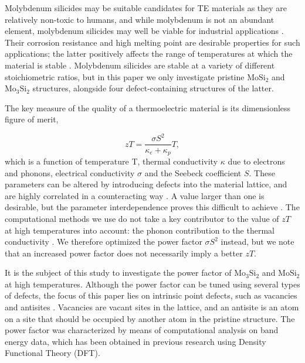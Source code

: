\documentclass[7.5pt]{article}
\theoremstyle{plain}
\theoremstyle{definition}
\newcommand{\<}{\langle}
\renewcommand{\>}{\rangle}
\begin{document}
\begin{multicols}{2}
Molybdenum silicides may be suitable candidates for TE materials as they are relatively non-toxic to humans, and while molybdenum is not an abundant element, molybdenum silicides may well be viable for industrial applications \cite{NOVOTNY2018272, HENCKENS201861, STOLOFF20001313}.
Their corrosion resistance and high melting point are desirable properties for such applications; the latter positively affects the range of temperatures at which the material is stable \cite{Nozariasbmarz_2017}.
Molybdenum silicides are stable at a variety of different stoichiometric ratios, but in this paper we only investigate pristine $\text{MoSi}_2$ and $\text{Mo}_3\text{Si}_2$ structures, alongside four defect-containing structures of the latter.
 
The key measure of the quality of a thermoelectric material is its dimensionless figure of merit,

\begin{equation}
z T=\frac{\sigma S^2}{\kappa_{e} + \kappa_{p}}T,
\label{eq:zt}
\end{equation}
 which is a function of temperature T, thermal conductivity $\kappa$ due to electrons and phonons, electrical conductivity $\sigma$ and the Seebeck coefficient $S$.
These parameters can be altered by introducing defects into the material lattice, and are highly correlated in a counteracting way \cite{alma9939162912205131}.
A value larger than one is desirable, but the parameter interdependence proves this difficult to achieve \cite{TakabatakeToshiro2014Petc}.
The computational methods we use do not take a key contributor to the value of $zT$ at high temperatures into account: the phonon contribution to the thermal conductivity \cite{cdi_proquest_reports_1030752835}.
We therefore optimized the power factor $\sigma S^2$ instead, but we note that an increased power factor does not necessarily imply a better $zT$.

It is the subject of this study to investigate the power factor of $\text{Mo}_3\text{Si}_2$ and $\text{MoSi}_2$ at high temperatures. 
Although the power factor can be tuned using several types of defects, the focus of this paper lies on intrinsic point defects, such as vacancies and antisites \cite{alma9939163749005131}. 
Vacancies are vacant sites in the lattice, and an antisite is an atom on a site that should be occupied by another atom in the pristine structure.
The power factor was characterized by means of computational analysis on band energy data, which has been obtained in previous research using Density Functional Theory (DFT).


\end{multicols}
\end{document}
